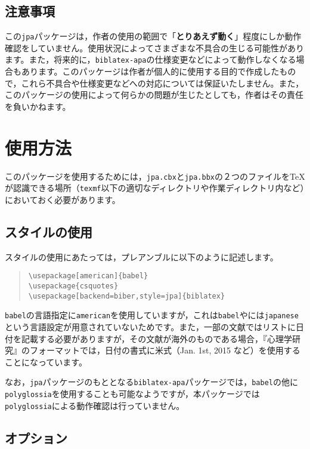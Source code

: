 \documentclass[12pt]{ltjsarticle}
\begin{document}
\subsection{注意事項}
この\texttt{jpa}パッケージは，作者の使用の範囲で「\textbf{とりあえず動く}」程度にしか動作確認をしていません。使用状況によってさまざまな不具合の生じる可能性があります。また，将来的に，\texttt{biblatex-apa}の仕様変更などによって動作しなくなる場合もあります。このパッケージは作者が個人的に使用する目的で作成したもので，これら不具合や仕様変更などへの対応については保証いたしません。また，このパッケージの使用によって何らかの問題が生じたとしても，作者はその責任を負いかねます。


\section{使用方法}
このパッケージを使用するためには，\texttt{jpa.cbx}と\texttt{jpa.bbx}の２つのファイルを{\TeX}が認識できる場所（\texttt{texmf}以下の適切なディレクトリや作業ディレクトリ内など）においておく必要があります。

\subsection{スタイルの使用}
スタイルの使用にあたっては，プレアンブルに以下のように記述します。

\begin{quote}
\begin{verbatim}
\usepackage[american]{babel}
\usepackage{csquotes}
\usepackage[backend=biber,style=jpa]{biblatex}
\end{verbatim}
\end{quote}


\texttt{babel}の言語指定に\texttt{american}を使用していますが，これは\texttt{babel}や{\BibLaTeX}には\texttt{japanese}という言語設定が用意されていないためです。また，一部の文献ではリストに日付を記載する必要がありますが，その文献が海外のものである場合，『心理学研究』のフォーマットでは，日付の書式に米式（Jan. 1st, 2015 など）を使用することになっています。

なお，\texttt{jpa}パッケージのもととなる\texttt{biblatex-apa}パッケージでは，\texttt{babel}の他に\texttt{polyglossia}を使用することも可能なようですが，本パッケージでは\texttt{polyglossia}による動作確認は行っていません。

\subsection{オプション}
\end{document}
